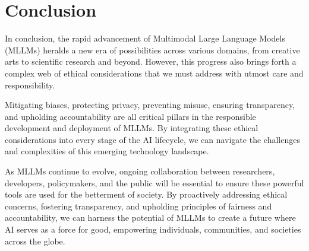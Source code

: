 \section{Conclusion}
In conclusion, the rapid advancement of Multimodal Large Language Models (MLLMs) heralds a new era of possibilities across various domains, from creative arts to scientific research and beyond. However, this progress also brings forth a complex web of ethical considerations that we must address with utmost care and responsibility.

Mitigating biases, protecting privacy, preventing misuse, ensuring transparency, and upholding accountability are all critical pillars in the responsible development and deployment of MLLMs. By integrating these ethical considerations into every stage of the AI lifecycle, we can navigate the challenges and complexities of this emerging technology landscape.

As MLLMs continue to evolve, ongoing collaboration between researchers, developers, policymakers, and the public will be essential to ensure these powerful tools are used for the betterment of society. By proactively addressing ethical concerns, fostering transparency, and upholding principles of fairness and accountability, we can harness the potential of MLLMs to create a future where AI serves as a force for good, empowering individuals, communities, and societies across the globe.



